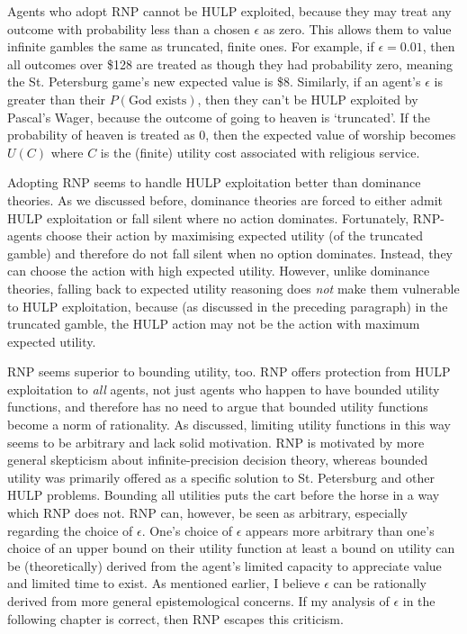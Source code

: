 \documentclass{article}
\begin{document}
Agents who adopt RNP cannot be HULP exploited, because they may treat any outcome with probability less than a chosen \(\epsilon\) as zero. This allows them to value infinite gambles the same as truncated, finite ones. For example, if \(\epsilon = 0.01\), then all outcomes over \$128 are treated as though they had probability zero, meaning the St. Petersburg game's new expected value is \$8. Similarly, if an agent's \(\epsilon\) is greater than their \(P(\text{God exists})\), then they can't be HULP exploited by Pascal's Wager, because the outcome of going to heaven is `truncated'. If the probability of heaven is treated as 0, then the expected value of worship becomes \(U(C)\) where \(C\) is the (finite) utility cost associated with religious service.

Adopting RNP seems to handle HULP exploitation better than dominance theories. As we discussed before, dominance theories are forced to either admit HULP exploitation or fall silent where no action dominates. Fortunately, RNP-agents choose their action by maximising expected utility (of the truncated gamble) and therefore do not fall silent when no option dominates. Instead, they can choose the action with high expected utility. However, unlike dominance theories, falling back to expected utility reasoning does \textit{not} make them vulnerable to HULP exploitation, because (as discussed in the preceding paragraph) in the truncated gamble, the HULP action may not be the action with maximum expected utility. 

RNP seems superior to bounding utility, too. RNP offers protection from HULP exploitation to \textit{all} agents, not just agents who happen to have bounded utility functions, and therefore has no need to argue that bounded utility functions become a norm of rationality. As discussed, limiting utility functions in this way seems to be arbitrary and lack solid motivation. RNP is motivated by more general skepticism about infinite-precision decision theory, whereas bounded utility was primarily offered as a specific solution to St. Petersburg and other HULP problems. Bounding all utilities puts the cart before the horse in a way which RNP does not. RNP can, however, be seen as arbitrary, especially regarding the choice of \(\epsilon\). One's choice of \(\epsilon\) appears more arbitrary than one's choice of an upper bound on their utility function \textemdash{} at least a bound on utility can be (theoretically) derived from the agent's limited capacity to appreciate value and limited time to exist. As mentioned earlier, I believe \(\epsilon\) can be rationally derived from more general epistemological concerns. If my analysis of \(\epsilon\) in the following chapter is correct, then RNP escapes this criticism.
\end{document}
